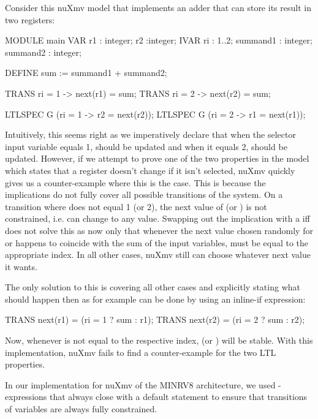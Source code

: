 \begin{example}
    Consider this nuXmv model that implements an adder that can store its result in two registers:
    \begin{smv}
MODULE main
    VAR
        r1 : integer;
        r2 :integer;
    IVAR
        ri : 1..2;
        summand1 : integer;
        summand2 : integer;

    DEFINE sum := summand1 + summand2;

    TRANS ri = 1 -> next(r1) = sum;
    TRANS ri = 2 -> next(r2) = sum;

    LTLSPEC G (ri = 1 -> r2 = next(r2));
    LTLSPEC G (ri = 2 -> r1 = next(r1));
    \end{smv}

    Intuitively, this seems right as we imperatively declare that when the selector input variable  equals 1,  should be updated and when it equals 2,  should be updated.
    However, if we attempt to prove one of the two properties in the model which states that a register doesn't change if it isn't selected, nuXmv quickly gives us a counter-example where this is the case.
    This is because the implications do not fully cover all possible transitions of the system.
    On a transition where  does not equal 1 (or 2), the next value of  (or ) is not constrained, i.e. can change to any value.
    Swapping out the implication \smvinline{->} with a iff \smvinline{<->} does not solve this as now only that whenever the next value chosen randomly for  or  happens to coincide with the sum of the input variables,  must be equal to the appropriate index.
    In all other cases, nuXmv still can choose whatever next value it wants.

    The only solution to this is covering all other cases and explicitly stating what should happen then as for example can be done by using an inline-if expression:
    \begin{smv}
TRANS next(r1) = (ri = 1 ? sum : r1);
TRANS next(r2) = (ri = 2 ? sum : r2);
    \end{smv}

    Now, whenever  is not equal to the respective index,  (or ) will be stable.
    With this implementation, nuXmv fails to find a counter-example for the two LTL properties.
\end{example}

In our implementation for nuXmv of the MINRV8 architecture, we used -expressions that always close with a default statement to ensure that transitions of variables are always fully constrained.

